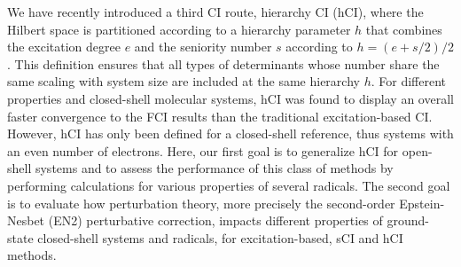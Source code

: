 \documentclass[aip,jcp,reprint,noshowkeys,superscriptaddress]{revtex4-1}
\begin{document}
We have recently introduced a third CI route, hierarchy CI (hCI), \cite{Kossoski_2022}
where the Hilbert space is partitioned according to a hierarchy parameter $h$ that combines the excitation degree $e$ and the seniority number $s$ according to $h = (e+s/2)/2$.
This definition ensures that all types of determinants whose number share the same scaling with system size are included at the same hierarchy $h$.
For different properties and closed-shell molecular systems, 
hCI was found to display an overall faster convergence to the FCI results than the traditional excitation-based CI. \cite{Kossoski_2022}
However, hCI has only been defined for a closed-shell reference, thus systems with an even number of electrons.
Here, our first goal is to generalize hCI for open-shell systems and to assess the performance of this class of methods by performing calculations for various properties of several radicals.
The second goal is to evaluate how perturbation theory, more precisely the second-order Epstein-Nesbet (EN2) perturbative correction, \cite{Garniron_2019}
impacts different properties of ground-state closed-shell systems and radicals, for excitation-based, sCI and hCI methods.
\end{document}
